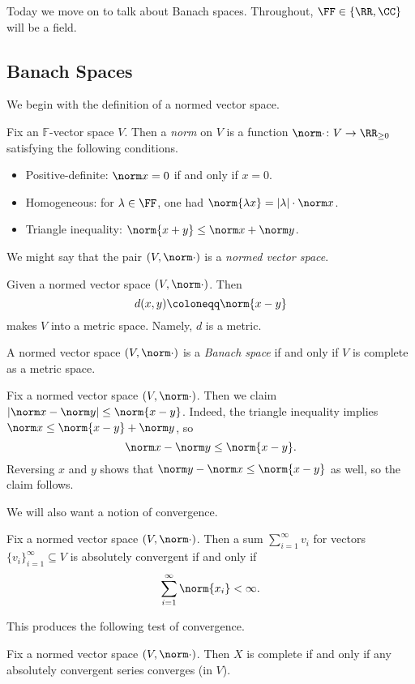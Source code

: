 \documentclass[../notes.tex]{subfiles}
\begin{document}
Today we move on to talk about Banach spaces. Throughout, $\FF\in\{\RR,\CC\}$ will be a field.

\subsection{Banach Spaces}
We begin with the definition of a normed vector space.
\begin{definition}[norm]
	Fix an $\mathbb F$-vector space $V$. Then a \textit{norm} on $V$ is a function $\norm\cdot\colon V\to\RR_{\ge0}$ satisfying the following conditions.
	\begin{itemize}
		\item Positive-definite: $\norm x=0$ if and only if $x=0$.
		\item Homogeneous: for $\lambda\in\FF$, one had $\norm{\lambda x}=\left|\lambda\right|\cdot\norm x$.
		\item Triangle inequality: $\norm{x+y}\le\norm x+\norm y$.
	\end{itemize}
	We might say that the pair $(V,\norm\cdot)$ is a \textit{normed vector space}.
\end{definition}
\begin{remark}
	Given a normed vector space $(V,\norm\cdot)$. Then
	\[d(x,y)\coloneqq\norm{x-y}\]
	makes $V$ into a metric space. Namely, $d$ is a metric.
\end{remark}
\begin{definition}
	A normed vector space $(V,\norm\cdot)$ is a \textit{Banach space} if and only if $V$ is complete as a metric space.
\end{definition}
\begin{remark}
	Fix a normed vector space $(V,\norm\cdot)$. Then we claim $\left|\norm x-\norm y\right|\le\norm{x-y}$. Indeed, the triangle inequality implies $\norm x\le\norm{x-y}+\norm y$, so
	\[\norm x-\norm y\le\norm{x-y}.\]
	Reversing $x$ and $y$ shows that $\norm y-\norm x\le\norm{x-y}$ as well, so the claim follows.
\end{remark}
We will also want a notion of convergence.
\begin{definition}
	Fix a normed vector space $(V,\norm\cdot)$. Then a sum $\sum_{i=1}^\infty v_i$ for vectors $\{v_i\}_{i=1}^\infty\subseteq V$ is absolutely convergent if and only if
	\[\sum_{i=1}^\infty\norm{x_i}<\infty.\]
\end{definition}
This produces the following test of convergence.
\begin{lemma}
	Fix a normed vector space $(V,\norm\cdot)$. Then $X$ is complete if and only if any absolutely convergent series converges (in $V$).
\end{lemma}
\end{document}
